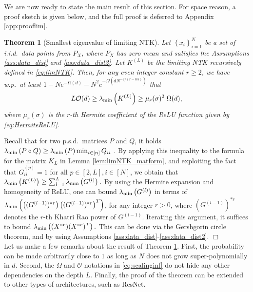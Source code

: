 \documentclass[11pt]{article}
\def\Set#1{\left\{ #1 \right\}}
\newtheorem{theorem}{Theorem}[section]
\newenvironment{proof}{\par\noindent{\bf Proof:\ }}{\hfill$\Box$\\[2mm]}
\newcommand{\bigOmg}[1]{\Omega\left(#1\right)}
\newcommand{\evmin}[1]{\lambda_{\rm min}\left(#1\right)}
\def\min{\mathop{\rm min}\nolimits}
\begin{document}
We are now ready to state the main result of this section. For space reason, a proof sketch is given below, and the full proof is deferred to Appendix \ref{app:prooflim}.
\begin{theorem}[Smallest eigenvalue of limiting NTK]\label{thm:limiting_NTK}
    Let $\Set{x_i}_{i=1}^{N}$ be a set of i.i.d.\ data points from $P_X$, where $P_X$ has zero mean and satisfies the Assumptions \ref{ass:data_dist} and \ref{ass:data_dist2}. 
    Let $K^{(L)}$ be the limiting NTK recursively defined in \eqref{eq:limNTK}. 
    Then, for any even integer constant $r\ge 2$, 
    we have w.p.\ at least $ 1 - Ne^{-\bigOmg{d}} - N^2e^{-\bigOmg{dN^{-2/(r-0.5)}}}$ that
        \vspace{-5pt}
    \begin{align}\label{eq:scalinginf}
	L\mathcal{O}(d)  
	\geq \evmin{K^{(L)}} \geq
	\mu_r(\sigma)^2\; \Omega(d), 
    \end{align}
    where $\mu_r(\sigma)$ is the $r$-th Hermite coefficient of the ReLU function given by \eqref{eq:HermiteReLU}.   
\end{theorem}
\begin{proof}
    Recall that for two p.s.d.\ matrices $P$ and $Q$, 
    it holds $\evmin{P\circ Q}\geq\evmin{P}\min_{i\in[n]}Q_{ii}$ \citep{schur1911bemerkungen}.
    By applying this inequality to the formula for the matrix $K_L$ in Lemma \ref{lem:limNTK_matform}, 
    and exploiting the fact that $\dot{G}^{(p)}_{ii}=1$ for all $p\in[2,L],i\in[N]$, 
    we obtain that $\evmin{K^{(L)}} \geq \sum_{l=1}^{L} \evmin{G^{(l)}}.$
    By using the Hermite expansion and homogeneity of ReLU, 
    one can bound $\evmin{G^{(l)}}$ in terms of $\evmin{\left((G^{(l-1)})^{*r}\right)\left((G^{(l-1)})^{*r}\right)^T}$, 
    for any integer $r>0$, where $(G^{(l-1)})^{*r}$ denotes the $r$-th Khatri Rao power of $G^{(l-1)}$. 
    Iterating this argument, it suffices to bound $\evmin{(X^{*r})(X^{*r})^T}.$ 
    This can be done via the Gershgorin circle theorem, and by using Assumptions \ref{ass:data_dist}-\ref{ass:data_dist2}.
\end{proof}
Let us make a few remarks about the result of Theorem \ref{thm:limiting_NTK}.
First, the probability can be made arbitrarily close to $1$ as long as $N$ does not grow super-polynomially in $d.$
Second, the $\Omega$ and $\mathcal{O}$ notations in \eqref{eq:scalinginf} do not hide any other dependencies on the depth $L.$
Finally, the proof of the theorem can be extended to other types of architectures, such as ResNet.
\end{document}
